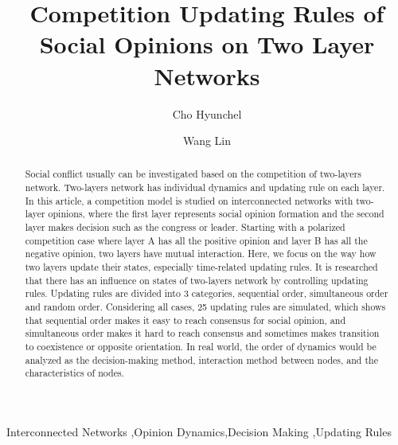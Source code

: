 \documentclass[review]{elsarticle}
\begin{document}
\begin{frontmatter}
\title{Competition Updating Rules of Social Opinions on Two Layer Networks}

\author[mymainaddress,mysecondaryaddress]{Cho Hyunchel}
\author[mymainaddress,mysecondaryaddress]{Wang Lin}
\address[mymainaddress]{Department of Automation, Shanghai Jiao Tong University, Shanghai 200240, P. R. China}
\address[mysecondaryaddress]{Key Laboratory of System Control and Information Processing, Ministry of Education of China, Shanghai 200240, P. R. China}

\begin{abstract}
Social conflict usually can be investigated based on the competition of two-layers network. Two-layers network has individual dynamics and updating rule on each layer. In this article, a competition model is studied on interconnected networks with two-layer opinions, where the first layer represents social opinion formation and the second layer makes decision such as the congress or leader. Starting with a polarized competition case where layer A has all the positive opinion and layer B has all the negative opinion, two layers have mutual interaction. Here, we focus on the way how two layers update their states, especially time-related updating rules. It is researched that there has an influence on states of two-layers network by controlling updating rules. Updating rules are divided into 3 categories, sequential order, simultaneous order and random order. Considering all cases, 25 updating rules are simulated, which shows that sequential order makes it easy to reach consensus for social opinion, and simultaneous order makes it hard to reach consensus and sometimes makes transition to coexistence or opposite orientation. In real world, the order of dynamics would be analyzed as the decision-making method, interaction method between nodes, and the characteristics of nodes. 

\end{abstract}

\begin{keyword}
Interconnected Networks \sep Opinion Dynamics\sep Decision Making \sep Updating Rules
\end{keyword}

\end{frontmatter}
\linenumbers
\end{document}
